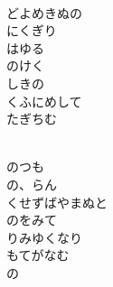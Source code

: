 \documentclass[10pt,b5j]{tarticle} %
\begin{document}
\begin{enumerate}
\begin{minipage}[c]{\blocksize}
    \end{minipage}
    \begin{minipage}[c]{\blocksize}
        
        \vspace{\linespace}
        \item~\\
        どよめきぬの\\
        にくぎり\\
        はゆる\\
        のけく\\
        しきの\\
        くふにめして\\
        たぎちむ
        
    \end{minipage}
    \begin{minipage}[c]{\blocksize}
        
        \vspace{\linespace}
        \item~\\
        のつも\\
        の、らん\\
        くせずばやまぬと\\
        のをみて\\
        りみゆくなり\\
        もてがなむ\\
        の
        
    \end{minipage}
    \begin{minipage}[c]{\blocksize}
        

\end{minipage}
\end{enumerate}
\end{document}
